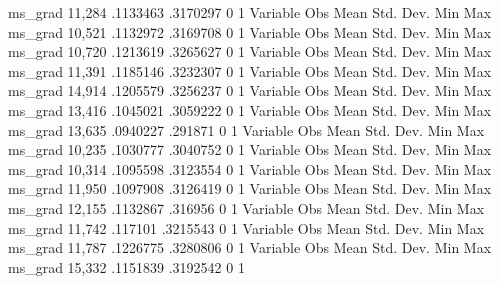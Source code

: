      ms_grad {\VBAR}     11,284    .1133463    .3170297          0          1
{\smallskip}
    Variable {\VBAR}        Obs        Mean    Std. Dev.       Min        Max
     ms_grad {\VBAR}     10,521    .1132972    .3169708          0          1
{\smallskip}
    Variable {\VBAR}        Obs        Mean    Std. Dev.       Min        Max
     ms_grad {\VBAR}     10,720    .1213619    .3265627          0          1
{\smallskip}
    Variable {\VBAR}        Obs        Mean    Std. Dev.       Min        Max
     ms_grad {\VBAR}     11,391    .1185146    .3232307          0          1
{\smallskip}
    Variable {\VBAR}        Obs        Mean    Std. Dev.       Min        Max
     ms_grad {\VBAR}     14,914    .1205579    .3256237          0          1
{\smallskip}
    Variable {\VBAR}        Obs        Mean    Std. Dev.       Min        Max
     ms_grad {\VBAR}     13,416    .1045021    .3059222          0          1
{\smallskip}
    Variable {\VBAR}        Obs        Mean    Std. Dev.       Min        Max
     ms_grad {\VBAR}     13,635    .0940227     .291871          0          1
{\smallskip}
    Variable {\VBAR}        Obs        Mean    Std. Dev.       Min        Max
     ms_grad {\VBAR}     10,235    .1030777    .3040752          0          1
{\smallskip}
    Variable {\VBAR}        Obs        Mean    Std. Dev.       Min        Max
     ms_grad {\VBAR}     10,314    .1095598    .3123554          0          1
{\smallskip}
    Variable {\VBAR}        Obs        Mean    Std. Dev.       Min        Max
     ms_grad {\VBAR}     11,950    .1097908    .3126419          0          1
{\smallskip}
    Variable {\VBAR}        Obs        Mean    Std. Dev.       Min        Max
     ms_grad {\VBAR}     12,155    .1132867     .316956          0          1
{\smallskip}
    Variable {\VBAR}        Obs        Mean    Std. Dev.       Min        Max
     ms_grad {\VBAR}     11,742     .117101    .3215543          0          1
{\smallskip}
    Variable {\VBAR}        Obs        Mean    Std. Dev.       Min        Max
     ms_grad {\VBAR}     11,787    .1226775    .3280806          0          1
{\smallskip}
    Variable {\VBAR}        Obs        Mean    Std. Dev.       Min        Max
     ms_grad {\VBAR}     15,332    .1151839    .3192542          0          1

